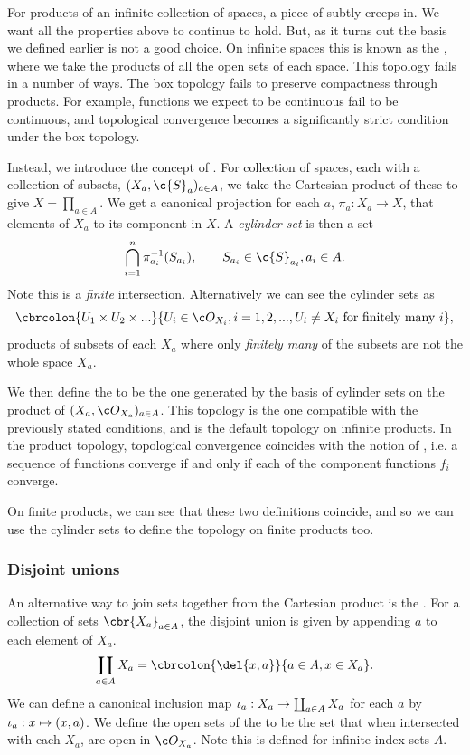 For products of an infinite collection of spaces, a piece of subtly creeps in.
We want all the properties above to continue to hold.
But, as it turns out the basis we defined earlier is not a good choice.
On infinite spaces this is known as the , where we take the products of all the open sets of each space.
This topology fails in a number of ways.
The box topology fails to preserve compactness through products.
For example, functions we expect to be continuous fail to be continuous, and topological convergence becomes a significantly strict condition under the box topology.

Instead, we introduce the concept of .
For collection of spaces, each with a collection of subsets, \((X_a, \c{S}_a)_{a\in A}\), we take the Cartesian product of these to give \(X = \prod_{a\in A}\).
We get a canonical projection for each \(a\), \(\pi_a: X_a \to X\), that elements of \(X_a\) to its component in \(X\).
A \emph{cylinder set} is then a set \[\Int_{i=1}^n \pi_{a_i}^{-1}(S_{a_i}), \quad\quad S_{a_i} \in \c{S}_{a_i}, a_i \in A .\]
Note this is a \emph{finite} intersection.
Alternatively we can see the cylinder sets as \[\cbrcolon{U_1 \times U_2 \times .
		..}{U_i \in \topo{X_i}, i=1,2,..., U_i \neq X_i \text{ for finitely many } i} \label{eq:cylendar_sets},\] products of subsets of each \(X_a\) where only \emph{finitely many} of the subsets are not the whole space \(X_a\).

We then define the  to be the one generated by the basis of cylinder sets on the product of \((X_a, \topo{X_a})_{a\in A}\).
This topology is the one compatible with the previously stated conditions, and is the default topology on infinite products.
In the product topology, topological convergence coincides with the notion of , i.e. a sequence of functions converge if and only if each of the component functions \(f_i\) converge.

On finite products, we can see that these two definitions coincide, and so we can use the cylinder sets to define the topology on finite products too.

\subsubsection{Disjoint unions}

An alternative way to join sets together from the Cartesian product is the .
For a collection of sets \(\cbr{X_a}_{a\in A}\), the disjoint union is given by appending \(a\) to each element of \(X_a\).
\[\coprod_{a\in A}
	X_a = \cbrcolon{\del{x, a}}{a\in A, x\in X_a}.\]
We can define a canonical inclusion map \(\iota_a: X_a \to \coprod_{a\in A} X_a\) for each \(a\) by \(\iota_a: x \mapsto (x, a)\).
We define the open sets of the  to be the set that when intersected with each \(X_a\), are open in \(\topo{X_a}\).
Note this is defined for infinite index sets \(A\).

